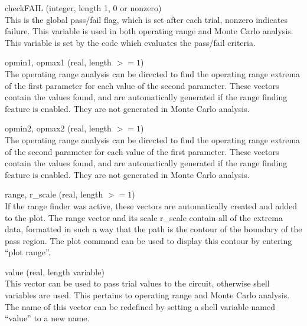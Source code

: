\begin{description}
\item{\et checkFAIL}  (integer, length 1, 0 or nonzero)\\
This is the global pass/fail flag, which is set after each trial, nonzero
indicates failure.  This variable is used in both operating range and
Monte Carlo analysis.  This variable is set by the code which evaluates
the pass/fail criteria.

\item{\et opmin1, opmax1} (real, length $>= 1$)\\
The operating range analysis can be directed to find the operating
range extrema of the first parameter for each value of the second
parameter.  These vectors contain the values found, and are automatically
generated if the range finding feature is enabled.  They are not generated
in Monte Carlo analysis.

\item{\et opmin2, opmax2} (real, length $>= 1$)\\
The operating range analysis can be directed to find the operating
range extrema of the second parameter for each value of the first
parameter.  These vectors contain the values found, and are automatically
generated if the range finding feature is enabled.  They are not generated
in Monte Carlo analysis.

\item{\et range, r\_scale} (real, length $>= 1$)\\
If the range finder was active, these vectors are automatically
created and added to the plot.  The {\et range} vector and its scale
{\et r\_scale} contain all of the extrema data, formatted in such a
way that the path is the contour of the boundary of the pass region. 
The {\cb plot} command can be used to display this contour by entering
``{\vt plot range}''.

\item{\et value} (real, length variable)\\
This vector can be used to pass trial values to the circuit, otherwise
shell variables are used.  This pertains to operating range and Monte
Carlo analysis.  The name of this vector can be redefined by setting
a shell variable named ``value'' to a new name.


\end{description}

